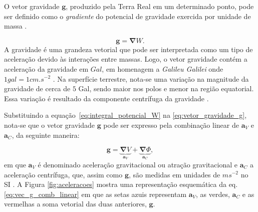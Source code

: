 O vetor gravidade $\mathbf{g}$, produzido pela Terra Real em um determinado ponto, pode ser definido como o \textit{gradiente} do potencial de gravidade exercida por unidade de massa \cite{hofmann2005}.

\begin{equation} \label{eq:vetor_gravidade_g}
\displaystyle {\mathbf{g}=  \mathbf{\nabla} {W}} .
\end{equation} A gravidade é uma grandeza vetorial que pode ser interpretada como um tipo de aceleração devido às interações entre massas. Logo, o vetor gravidade contém a aceleração da gravidade  em $Gal$, em homenagem a \textit{Galileu Galilei} onde $1 gal= 1 cm.s^{-2}$ \cite{hofmann2005,escobar2000}. Na superfície terrestre, nota-se uma variação na magnitude da gravidade de cerca de $5$ Gal, sendo maior nos polos e menor na região equatorial. Essa variação é resultado da componente centrífuga da gravidade \cite{escobar2000,geodesia}. 

Substituindo a equação~\ref{eq:integral_potencial_W} na \ref{eq:vetor_gravidade_g}, nota-se que o vetor gravidade $\mathbf{g}$ pode ser expresso pela combinação linear de $\mathbf{a}_V$ e $\mathbf{a}_C$, da seguinte maneira:

\begin{equation} \label{eq:vec_g_comb_linear}
\displaystyle {\mathbf{g} = \underbrace{\mathbf{\nabla} { V }}_{\mathbf{a}_V} + \underbrace{\mathbf{\nabla} {\Phi} }_{\mathbf{a}_C} },
\end{equation} em que $\mathbf{a}_V$ é denominado aceleração gravitacional ou atração gravitacional \cite{hofmann2005} e $\mathbf{a}_C$ a aceleração centrífuga, que, assim como $\mathbf{g}$, são medidas em unidades de $ms^{-2}$ no SI \cite{torge}. A Figura \ref{fig:aceleracoes} mostra uma representação esquemática da eq. \ref{eq:vec_g_comb_linear} em que as setas azuis representam $\mathbf{a}_V$, as verdes, $\mathbf{a}_C$ e as vermelhas a soma vetorial das duas anteriores, $\mathbf{g}$.

